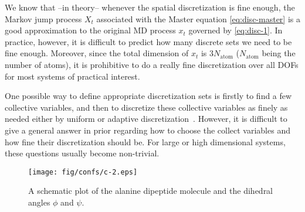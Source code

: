\documentclass[aps, pre, preprint,unsortedaddress,a4paper,onecolumn]{revtex4}
\begin{document}
We know that --in theory-- whenever the spatial discretization is fine enough, the Markov jump
process $X_t$ associated with the Master equation \eqref{eq:disc-master} is a good approximation to the original
MD process $x_t$ governed by \eqref{eq:disc-1}.  In practice, however, it is difficult to predict
how many discrete sets we need to be fine enough. Moreover, since the
total dimension of $x_t$ is $3N_{\textrm{atom}}$ ($N_{\textrm{atom}}$ being the number of atoms), it is prohibitive to do a really fine discretization
over all DOFs for most systems of practical interest.

One possible way to define appropriate discretization sets is firstly to find a few collective
variables, and then to discretize these collective variables as finely as needed either by uniform or adaptive
discretization~\cite{chodera2007automatic, prinz2011markov}.
However, it is difficult to give a general answer in prior regarding
how to choose the collect variables and how fine their discretization should be.
For large or high dimensional systems, these questions usually become non-trivial. 

\begin{figure}
  \centering
  \texttt{[image: fig/confs/c-2.eps]}
  \caption{A schematic plot of the alanine dipeptide molecule and the dihedral angles $\phi$ and $\psi$.}
  \label{fig:tmp1}
\end{figure}
\end{document}
